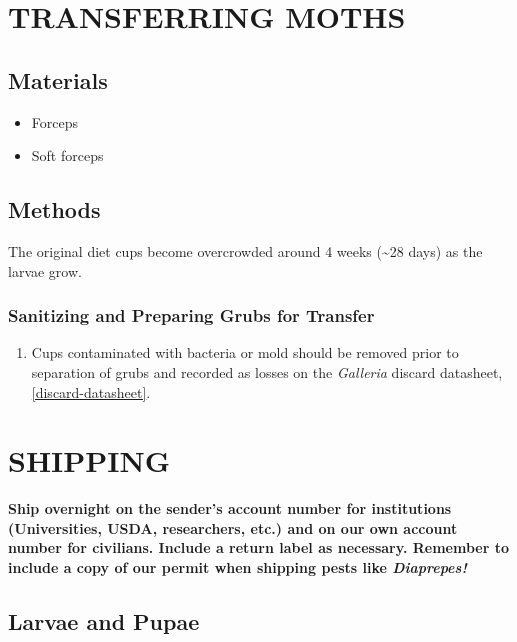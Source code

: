 \documentclass{sop_class}[overrideChapters] %
\providecommand{\tightlist}{%
  \setlength{\itemsep}{0pt}\setlength{\parskip}{0pt}}
\begin{document}
{{\chapter{TRANSFERRING MOTHS}\label{moth-transfers}}

\hypertarget{materials-4}{%
\section{Materials}\label{materials-4}}
\begin{itemize}
\tightlist
\item
  Forceps
\item
  Soft forceps
\end{itemize}
\hypertarget{methods-4}{%
\section{Methods}\label{methods-4}}

The original diet cups become overcrowded around 4 weeks (\textasciitilde28 days) as
the larvae grow.

\hypertarget{sanitizing-and-preparing-grubs-for-transfer}{%
\subsection{Sanitizing and Preparing Grubs for Transfer}\label{sanitizing-and-preparing-grubs-for-transfer}}
\begin{enumerate}
\def\labelenumi{\arabic{enumi}.}
\tightlist
\item
  Cups contaminated with bacteria or mold should be removed prior to
  separation of grubs and recorded as losses on the \emph{Galleria}
  discard datasheet, \ref{discard-datasheet}.
\end{enumerate}
\hypertarget{shipping}{%
\chapter{SHIPPING}\label{shipping}}

\textbf{Ship overnight on the sender's account number for institutions
(Universities, USDA, researchers, etc.) and on our own account number
for civilians. Include a return label as necessary. Remember to include a copy of our permit when shipping pests like \textit{Diaprepes!}}

\hypertarget{ship-larvae-pupae}{%
\section{Larvae and Pupae}\label{ship-larvae-pupae}}

}
\end{document}
